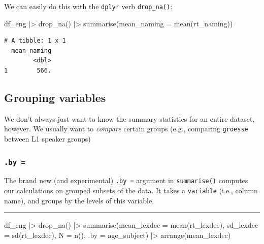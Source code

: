 \documentclass[
  letterpaper,
  DIV=11,
  numbers=noendperiod]{scrartcl}
\newenvironment{Shaded}{\begin{snugshade}}{\end{snugshade}}
\newcommand{\AttributeTok}[1]{\textcolor[rgb]{0.40,0.45,0.13}{#1}}
\newcommand{\FunctionTok}[1]{\textcolor[rgb]{0.28,0.35,0.67}{#1}}
\newcommand{\NormalTok}[1]{\textcolor[rgb]{0.00,0.23,0.31}{#1}}
\newcommand{\SpecialCharTok}[1]{\textcolor[rgb]{0.37,0.37,0.37}{#1}}
\begin{document}
\begin{tcolorbox}
We can easily do this with the \texttt{dplyr} verb \texttt{drop\_na()}:

\begin{Shaded}
\begin{Highlighting}[]
\NormalTok{df\_eng }\SpecialCharTok{|\textgreater{}}
  \FunctionTok{drop\_na}\NormalTok{() }\SpecialCharTok{|\textgreater{}}
  \FunctionTok{summarise}\NormalTok{(}\AttributeTok{mean\_naming =} \FunctionTok{mean}\NormalTok{(rt\_naming))}
\end{Highlighting}
\end{Shaded}

\begin{verbatim}
# A tibble: 1 x 1
  mean_naming
        <dbl>
1        566.
\end{verbatim}

\end{tcolorbox}

\hypertarget{grouping-variables}{%
\subsection{Grouping variables}\label{grouping-variables}}

We don't always just want to know the summary statistics for an entire
dataset, however. We usually want to \emph{compare} certain groups
(e.g., comparing \texttt{groesse} between L1 speaker groups)

\hypertarget{by}{%
\subsubsection{\texorpdfstring{\texttt{.by\ =}}{.by =}}\label{by}}

The brand new (and experimental) \texttt{.by\ =} argument in
\texttt{summarise()} computes our calculations on grouped subsets of the
data. It takes a \texttt{variable} (i.e., column name), and groups by
the levels of this variable.

\begin{center}\rule{0.5\linewidth}{0.5pt}\end{center}

\begin{Shaded}
\begin{Highlighting}[]
\NormalTok{df\_eng }\SpecialCharTok{|\textgreater{}}
  \FunctionTok{drop\_na}\NormalTok{() }\SpecialCharTok{|\textgreater{}}
  \FunctionTok{summarise}\NormalTok{(}\AttributeTok{mean\_lexdec =} \FunctionTok{mean}\NormalTok{(rt\_lexdec),}
            \AttributeTok{sd\_lexdec =} \FunctionTok{sd}\NormalTok{(rt\_lexdec),}
            \AttributeTok{N =} \FunctionTok{n}\NormalTok{(),}
            \AttributeTok{.by =}\NormalTok{ age\_subject) }\SpecialCharTok{|\textgreater{}}
  \FunctionTok{arrange}\NormalTok{(mean\_lexdec)}
\end{Highlighting}
\end{Shaded}
\end{document}
